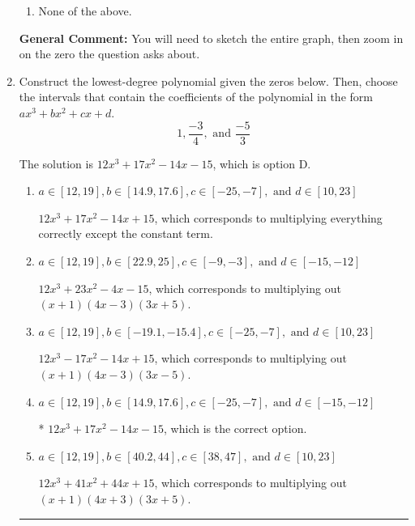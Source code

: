 \documentclass{extbook}[14pt]
\newcommand{\litem}[1]{\item #1

\rule{\textwidth}{0.4pt}}
\begin{document}
\begin{enumerate}
{\begin{enumerate}[label=\Alph*.]
\item None of the above.\end{enumerate}
\textbf{General Comment:} You will need to sketch the entire graph, then zoom in on the zero the question asks about.
}
\litem{
Construct the lowest-degree polynomial given the zeros below. Then, choose the intervals that contain the coefficients of the polynomial in the form $ax^3+bx^2+cx+d$.
\[ 1, \frac{-3}{4}, \text{ and } \frac{-5}{3} \]

The solution is \( 12x^{3} +17 x^{2} -14 x -15 \), which is option D.\begin{enumerate}[label=\Alph*.]
\item \( a \in [12, 19], b \in [14.9, 17.6], c \in [-25, -7], \text{ and } d \in [10, 23] \)

$12x^{3} +17 x^{2} -14 x + 15$, which corresponds to multiplying everything correctly except the constant term.
\item \( a \in [12, 19], b \in [22.9, 25], c \in [-9, -3], \text{ and } d \in [-15, -12] \)

$12x^{3} +23 x^{2} -4 x -15$, which corresponds to multiplying out $(x + 1)(4x -3)(3x + 5)$.
\item \( a \in [12, 19], b \in [-19.1, -15.4], c \in [-25, -7], \text{ and } d \in [10, 23] \)

$12x^{3} -17 x^{2} -14 x + 15$, which corresponds to multiplying out $(x + 1)(4x -3)(3x -5)$.
\item \( a \in [12, 19], b \in [14.9, 17.6], c \in [-25, -7], \text{ and } d \in [-15, -12] \)

* $12x^{3} +17 x^{2} -14 x -15$, which is the correct option.
\item \( a \in [12, 19], b \in [40.2, 44], c \in [38, 47], \text{ and } d \in [10, 23] \)

$12x^{3} +41 x^{2} +44 x + 15$, which corresponds to multiplying out $(x + 1)(4x + 3)(3x + 5)$.
\end{enumerate}

}
\end{enumerate}
\end{document}
